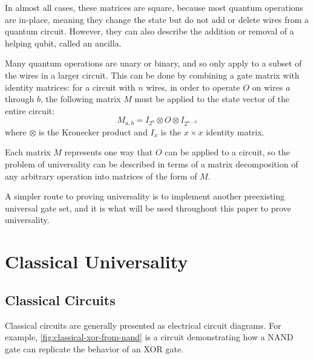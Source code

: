 \documentclass[12pt]{article}
\begin{document}
In almost all cases, these matrices are square, because most quantum operations are in-place, meaning they change the state but do not add or delete wires from a quantum circuit. However, they can also describe the addition or removal of a helping qubit, called an ancilla.

Many quantum operations are unary or binary, and so only apply to a subset of the wires in a larger circuit. This can be done by combining a gate matrix with identity matrices: for a circuit with $n$ wires, in order to operate $O$ on wires $a$ through $b$, the following matrix $M$ must be applied to the state vector of the entire circuit:
$$
M_{a, b} = I_{2^a} \otimes O \otimes I_{2^{n - b}}
$$
where $\otimes$ is the Kronecker product and $I_x$ is the $x \times x$ identity matrix.

Each matrix $M$ represents one way that $O$ can be applied to a circuit, so the problem of universality can be described in terms of a matrix decomposition of any arbitrary operation into matrices of the form of $M$.

A simpler route to proving universality is to implement another preexisting universal gate set, and it is what will be used throughout this paper to prove universality.

\section{Classical Universality}
\subsection{Classical Circuits}
Classical circuits are generally presented as electrical circuit diagrams. For example, \autoref{fig:classical-xor-from-nand} is a circuit demonstrating how a NAND gate can replicate the behavior of an XOR gate.
\end{document}
